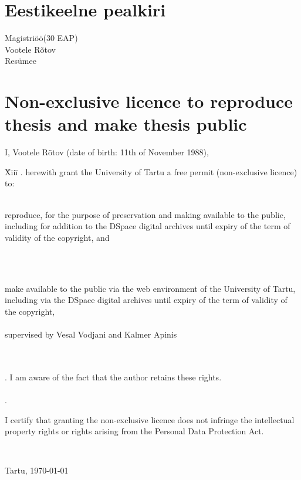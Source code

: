 \documentclass{style/master-thesis}
\begin{document}
\newpage


\section{Eestikeelne pealkiri}
Magistriöö(30 EAP) \\
Vootele Rõtov \\
Resümee \\




\newpage



\appendix
\pagebreak
\section*{\small Non-exclusive licence to reproduce thesis and make thesis public}


I, Vootele Rõtov (date of birth: 11th of November 1988),

\begin{tabbing}
\= Xiii\=\kill
{}. \> herewith grant the University of Tartu a free permit (non-exclusive licence) to:\\\\ 

\> 
\begin{minipage}[t]{14.2cm}
reproduce, for the purpose of preservation and making available to the public, including for addition to the DSpace digital archives until expiry of the term of validity of the copyright, and
\end{minipage}
\\\\
\begin{minipage}[t]{14.2cm}
make available to the public via the web environment of the University of Tartu, including via the DSpace digital archives until expiry of the term of validity of the copyright,\\ 

\articleName\\   

supervised by Vesal Vodjani and Kalmer Apinis

\end{minipage}\\\\ 
. \>I am aware of the fact that the author retains these rights.\\\\
. \>
\begin{minipage}[t]{14.2cm}
I certify that granting the non-exclusive licence does not infringe the intellectual property rights or rights arising from the Personal Data Protection Act. 
\end{minipage}\\
\end{tabbing}

\noindent
Tartu, \today
\end{document}
